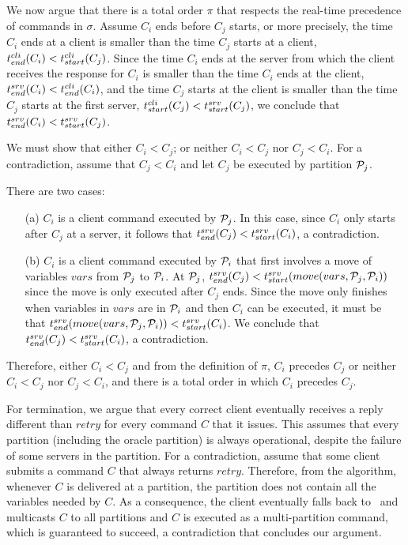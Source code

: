 %
We now argue that there is a total order $\pi$ that respects the real-time precedence of commands in $\sigma$.
Assume $C_i$ ends before $C_j$ starts, or more precisely, the time $C_i$ ends at a client is smaller than the time $C_j$ starts at a client, $t^{cli}_{end}(C_i) < t^{cli}_{start}(C_j)$.
Since the time $C_i$ ends at the server from which the client receives the response for $C_i$ is smaller than the time $C_i$ ends at the client, $t^{srv}_{end}(C_i) < t^{cli}_{end}(C_i)$, and the time $C_j$ starts at the client is smaller than the time $C_j$ starts at the first server, $t^{cli}_{start}(C_j) < t^{srv}_{start}(C_j)$, we conclude that $t^{srv}_{end}(C_i) < t^{srv}_{start}(C_j)$.

We must show that either $C_i < C_j$; or neither $C_i < C_j$ nor $C_j < C_i$.
For a contradiction, assume that $C_j <  C_i$ and let $C_j$ be executed by partition $\mathcal{P}_j$.

There are two cases: 
\begin{enumerate}
\item[(a)] $C_i$ is a client command executed by $\mathcal{P}_j$.
In this case, since $C_i$ only starts after $C_j$ at a server, it follows that $t^{srv}_{end}(C_j) < t^{srv}_{start}(C_i)$, a contradiction.
\item[(b)] $C_i$ is a client command executed by $\mathcal{P}_i$ that first involves a move of variables $vars$ from $\mathcal{P}_j$ to $\mathcal{P}_i$.
At $\mathcal{P}_j$, $t^{srv}_{end}(C_j) < t^{srv}_{start}(move(vars,\mathcal{P}_j,\mathcal{P}_i))$ since the move is only executed after $C_j$ ends.
Since the move only finishes when variables in $vars$ are in $\mathcal{P}_i$ and then $C_i$ can be executed, it must be that
$t^{srv}_{end}(move(vars,\mathcal{P}_j,\mathcal{P}_i)) < t^{srv}_{start}(C_i)$.
We conclude that $t^{srv}_{end}(C_j) < t^{srv}_{start}(C_i)$, a contradiction.
\end{enumerate}
Therefore, either $C_i < C_j$ and from the definition of $\pi$, $C_i$ precedes $C_j$ or neither $C_i < C_j$ nor $C_j < C_i$, and there is a total order in which $C_i$ precedes $C_j$.

For termination, we argue that every correct client eventually receives a reply different than $retry$ for every command $C$ that it issues.
This assumes that every partition (including the oracle partition) is always operational, despite the failure of some servers in the partition.
For a contradiction, assume that some client submits a command $C$ that always returns $retry$.
Therefore, from the algorithm, whenever $C$ is delivered at a partition, the partition does not contain all the variables needed by $C$.
As a consequence, the client eventually falls back to \ssmr\ and multicasts $C$ to all partitions and $C$ is executed as a multi-partition command, which is guaranteed to succeed, a contradiction that concludes our argument.


